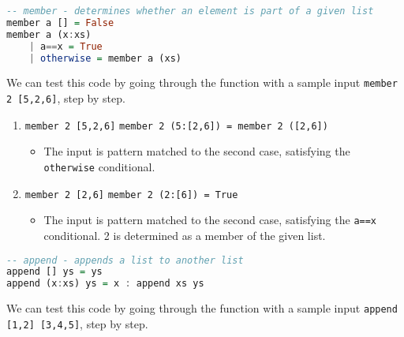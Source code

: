 \documentclass{article}
\theoremstyle{theorem}
\theoremstyle{definition}
\theoremstyle{remark}
\begin{document}
\begin{lstlisting}[language=Haskell]
-- member - determines whether an element is part of a given list
member a [] = False
member a (x:xs)
    | a==x = True
    | otherwise = member a (xs)
\end{lstlisting}
    
\noindent We can test this code by going through the function with a sample input \texttt{member 2 [5,2,6]}, step by step.

\begin{enumerate}[noitemsep]
    \item \texttt{member 2 [5,2,6]}
    \linebreak \texttt{member 2 (5:[2,6]) = member 2 ([2,6])}
    \begin{itemize}
        \item The input is pattern matched to the second case, satisfying the \texttt{otherwise} conditional.
    \end{itemize} 
    \item \texttt{member 2 [2,6]}
    \linebreak \texttt{member 2 (2:[6]) = True}
    \begin{itemize}
        \item The input is pattern matched to the second case, satisfying the \texttt{a==x} conditional. 2 is determined as a member of the given list.
    \end{itemize} 
\end{enumerate}

\begin{lstlisting}[language=Haskell]
-- append - appends a list to another list
append [] ys = ys
append (x:xs) ys = x : append xs ys
\end{lstlisting}
    
\noindent We can test this code by going through the function with a sample input \texttt{append [1,2] [3,4,5]}, step by step.
\end{document}

